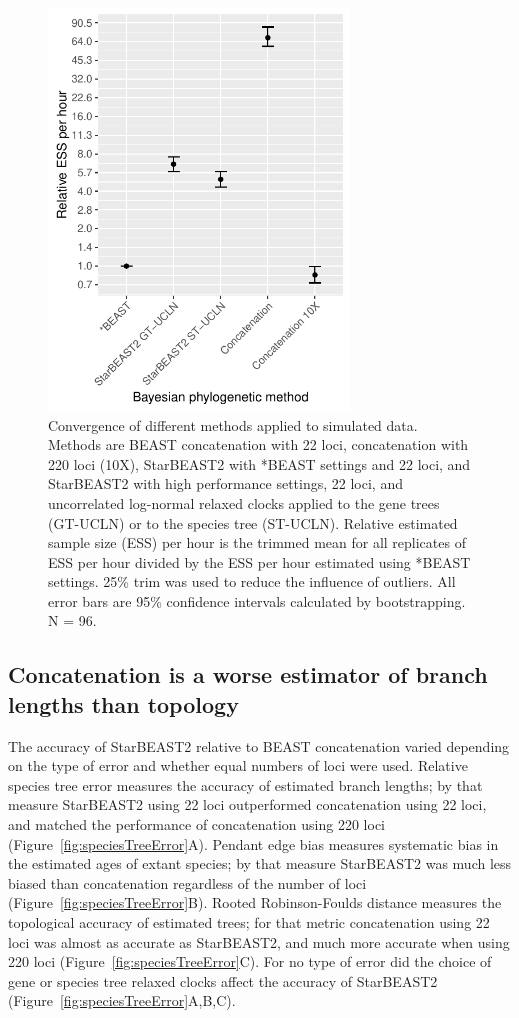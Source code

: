 \documentclass[12pt]{article}
\begin{document}
\begin{figure}[htb!]
\centering
\includegraphics[width=8cm]{minimum_relative_ess_per_hour.pdf}
\caption
{Convergence of different methods applied to simulated data. Methods are
BEAST concatenation with 22 loci, concatenation with 220 loci (10X), StarBEAST2 with
*BEAST settings and 22 loci, and StarBEAST2 with high performance settings, 22 loci,
and uncorrelated log-normal relaxed clocks applied to the gene trees (GT-UCLN) or
to the species tree (ST-UCLN). Relative estimated sample size (ESS) per hour is the trimmed mean for all replicates of
ESS per hour divided by the ESS per hour estimated using *BEAST
settings. 25\% trim was used to reduce the influence of
outliers. All error bars are 95\% confidence intervals calculated by
bootstrapping. N = 96.}
\label{fig:simulatedEssPerHour}
\end{figure}

\subsection{Concatenation is a worse estimator of branch lengths than topology}

The accuracy of StarBEAST2 relative to BEAST concatenation varied depending on the
type of error and whether equal numbers of loci were used. Relative species tree
error measures the accuracy of estimated branch lengths; by that measure
StarBEAST2 using 22 loci outperformed concatenation using 22 loci, and matched
the performance of concatenation using 220 loci
(Figure~\ref{fig:speciesTreeError}A). Pendant edge bias measures systematic bias
in the estimated ages of extant species; by that measure StarBEAST2 was much
less biased than concatenation regardless of the number of loci
(Figure~\ref{fig:speciesTreeError}B). Rooted Robinson-Foulds distance measures
the topological accuracy of estimated trees; for that metric concatenation using
22 loci was almost as accurate as StarBEAST2, and much more accurate when using
220 loci (Figure~\ref{fig:speciesTreeError}C). For no type of error did the
choice of gene or species tree relaxed clocks affect the accuracy of StarBEAST2
(Figure~\ref{fig:speciesTreeError}A,B,C).
\end{document}
